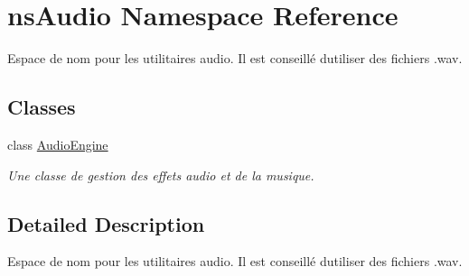 \hypertarget{namespacens_audio}{}\section{ns\+Audio Namespace Reference}
\label{namespacens_audio}


Espace de nom pour les utilitaires audio. Il est conseillé d\textquotesingle{}utiliser des fichiers .wav.  


\subsection*{Classes}
\begin{DoxyCompactItemize}
\item 
class \hyperlink{classns_audio_1_1_audio_engine}{Audio\+Engine}
\begin{DoxyCompactList}\small\item\em Une classe de gestion des effets audio et de la musique. \end{DoxyCompactList}\end{DoxyCompactItemize}


\subsection{Detailed Description}
Espace de nom pour les utilitaires audio. Il est conseillé d\textquotesingle{}utiliser des fichiers .wav. 